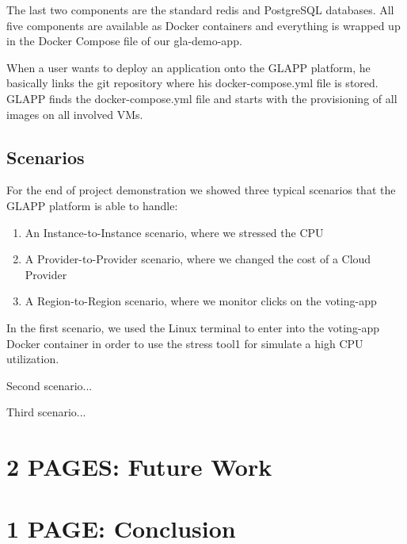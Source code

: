 \documentclass{seal_thesis}
\begin{document}
The last two components are the standard redis and PostgreSQL databases.
All five components are available as Docker containers and everything is wrapped up in the Docker Compose file of our gla-demo-app.

When a user wants to deploy an application onto the GLAPP platform, he basically links the git repository where his docker-compose.yml file is stored.
GLAPP finds the docker-compose.yml file and starts with the provisioning of all images on all involved VMs.

\section{Scenarios}
For the end of project demonstration we showed three typical scenarios that the GLAPP platform is able to handle:
\begin{enumerate}
	\item An Instance-to-Instance scenario, where we stressed the CPU
	\item A Provider-to-Provider scenario, where we changed the cost of a Cloud Provider
	\item A Region-to-Region scenario, where we monitor clicks on the voting-app
\end{enumerate}

In the first scenario, we used the Linux terminal to enter into the voting-app Docker container in order to use the stress tool1 for simulate a high CPU utilization.

Second scenario...

Third scenario...


\chapter{2 PAGES: Future Work}\label{ch:futurework}



\chapter{1 PAGE: Conclusion}\label{ch:conclusion}





\end{document}
